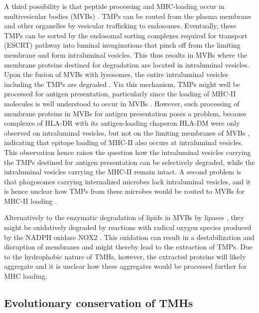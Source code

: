 \documentclass[utf8]{frontiersSCNS} %
\begin{document}
A third possibility is that peptide processing and MHC-loading occur in multivesicular bodies (MVBs) \citep{oliveira2015alternative}. 
TMPs can be routed from the plasma membrane and other organelles by vesicular trafficking to endosomes. Eventually, these TMPs can be sorted by the endosomal sorting complexes required for transport (ESCRT) pathway into luminal invaginations that pinch off from the limiting membrane and form intraluminal vesicles. This thus results in MVBs where the membrane proteins destined for degradation are located in intraluminal vesicles. Upon the fusion of MVBs with lysosomes, 
the entire intraluminal vesicles including the TMPs are degraded \citep{gruenberg2020life}. 
Via this mechanism, TMPs might well be processed for antigen presentation, 
particularly since the loading of MHC-II molecules is well understood 
to occur in MVBs \citep{kleijmeer2001reorganization,peters1991segregation,zwart2005spatial}. 
However, such processing of membrane proteins in MVBs for antigen presentation poses a problem, because complexes of HLA-DR with its antigen-loading chaperon HLA-DM were only observed on intraluminal vesicles, 
but not on the limiting membranes of MVBs \citep{zwart2005spatial}, 
indicating that epitope loading of MHC-II also occurs at intraluminal vesicles. This observation hence raises the question how the intraluminal vesicles carrying the TMPs destined for antigen presentation can be selectively degraded, while the intraluminal vesicles carrying the MHC-II remain intact. A second problem is that phagosomes carrying internalized microbes lack intraluminal vesicles, 
and it is hence unclear how TMPs from these microbes 
would be routed to MVBs for MHC-II loading \citep{zwart2005spatial}.

Alternatively to the enzymatic degradation of lipids in MVBs by lipases \citep{sander2016lipase,gilleron2016lysosomal}, 
they might be oxidatively degraded by reactions with radical oxygen species produced by the NADPH oxidase NOX2 \citep{dingjan2016lipid}. 
This oxidation can result in a destabilization and disruption of membranes \citep{dingjan2016lipid} 
and might thereby lead to the extraction of TMPs. 
Due to the hydrophobic nature of TMHs, 
however, the extracted proteins will likely aggregate 
and it is unclear how these aggregates would be processed further for MHC loading. 


\subsection{Evolutionary conservation of TMHs}
\end{document}

